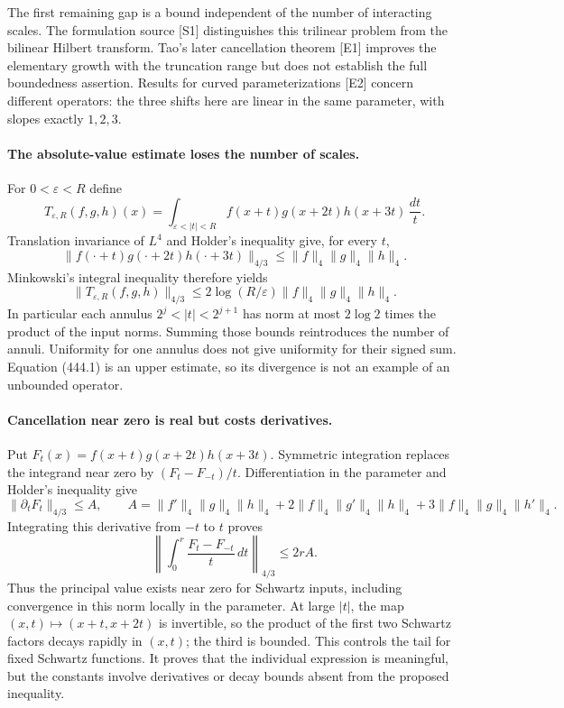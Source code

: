 \documentclass[11pt]{article}
\begin{document}
The first remaining gap is a bound independent of the number of interacting scales. The formulation source [S1] distinguishes this trilinear problem from the bilinear Hilbert transform. Tao's later cancellation theorem [E1] improves the elementary growth with the truncation range but does not establish the full boundedness assertion. Results for curved parameterizations [E2] concern different operators: the three shifts here are linear in the same parameter, with slopes exactly $1,2,3$.

\paragraph{The absolute-value estimate loses the number of scales.}
For $0<\varepsilon<R$ define
\[
 T_{\varepsilon,R}(f,g,h)(x)=
 \int_{\varepsilon<|t|<R}f(x+t)g(x+2t)h(x+3t)\,\frac{dt}{t}.
\]
Translation invariance of $L^4$ and Holder's inequality give, for every $t$,
\[
 \|f(\cdot+t)g(\cdot+2t)h(\cdot+3t)\|_{4/3}
 \le\|f\|_4\|g\|_4\|h\|_4.
\]
Minkowski's integral inequality therefore yields
\[
 \|T_{\varepsilon,R}(f,g,h)\|_{4/3}
 \le2\log(R/\varepsilon)\|f\|_4\|g\|_4\|h\|_4.
 \tag{444.1}
\]
In particular each annulus $2^j<|t|<2^{j+1}$ has norm at most $2\log2$ times the product of the input norms. Summing those bounds reintroduces the number of annuli. Uniformity for one annulus does not give uniformity for their signed sum. Equation (444.1) is an upper estimate, so its divergence is not an example of an unbounded operator.

\paragraph{Cancellation near zero is real but costs derivatives.}
Put $F_t(x)=f(x+t)g(x+2t)h(x+3t)$. Symmetric integration replaces the integrand near zero by $(F_t-F_{-t})/t$. Differentiation in the parameter and Holder's inequality give
\[
 \|\partial_tF_t\|_{4/3}\le A,
 \qquad
 A=\|f'\|_4\|g\|_4\|h\|_4
 +2\|f\|_4\|g'\|_4\|h\|_4
 +3\|f\|_4\|g\|_4\|h'\|_4.
\]
Integrating this derivative from $-t$ to $t$ proves
\[
 \left\|\int_0^r\frac{F_t-F_{-t}}t\,dt\right\|_{4/3}
 \le2rA. \tag{444.2}
\]
Thus the principal value exists near zero for Schwartz inputs, including convergence in this norm locally in the parameter. At large $|t|$, the map $(x,t)\mapsto(x+t,x+2t)$ is invertible, so the product of the first two Schwartz factors decays rapidly in $(x,t)$; the third is bounded. This controls the tail for fixed Schwartz functions. It proves that the individual expression is meaningful, but the constants involve derivatives or decay bounds absent from the proposed inequality.
\end{document}
